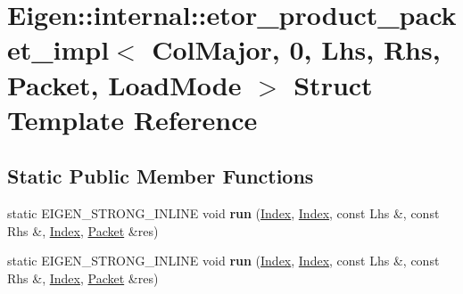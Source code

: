 \hypertarget{struct_eigen_1_1internal_1_1etor__product__packet__impl_3_01_col_major_00_010_00_01_lhs_00_01_rh608f8b3bd7848082420c49062c17a738}{}\section{Eigen\+:\+:internal\+:\+:etor\+\_\+product\+\_\+packet\+\_\+impl$<$ Col\+Major, 0, Lhs, Rhs, Packet, Load\+Mode $>$ Struct Template Reference}
\label{struct_eigen_1_1internal_1_1etor__product__packet__impl_3_01_col_major_00_010_00_01_lhs_00_01_rh608f8b3bd7848082420c49062c17a738}
\subsection*{Static Public Member Functions}
\begin{DoxyCompactItemize}
\item 
\mbox{\label{struct_eigen_1_1internal_1_1etor__product__packet__impl_3_01_col_major_00_010_00_01_lhs_00_01_rh608f8b3bd7848082420c49062c17a738_ab5bd5c2e1ef7f99f07d45f645fd88a00}} 
static E\+I\+G\+E\+N\+\_\+\+S\+T\+R\+O\+N\+G\+\_\+\+I\+N\+L\+I\+NE void {\bfseries run} (\hyperlink{namespace_eigen_a62e77e0933482dafde8fe197d9a2cfde}{Index}, \hyperlink{namespace_eigen_a62e77e0933482dafde8fe197d9a2cfde}{Index}, const Lhs \&, const Rhs \&, \hyperlink{namespace_eigen_a62e77e0933482dafde8fe197d9a2cfde}{Index}, \hyperlink{union_eigen_1_1internal_1_1_packet}{Packet} \&res)
\item 
\mbox{\label{struct_eigen_1_1internal_1_1etor__product__packet__impl_3_01_col_major_00_010_00_01_lhs_00_01_rh608f8b3bd7848082420c49062c17a738_ab5bd5c2e1ef7f99f07d45f645fd88a00}} 
static E\+I\+G\+E\+N\+\_\+\+S\+T\+R\+O\+N\+G\+\_\+\+I\+N\+L\+I\+NE void {\bfseries run} (\hyperlink{namespace_eigen_a62e77e0933482dafde8fe197d9a2cfde}{Index}, \hyperlink{namespace_eigen_a62e77e0933482dafde8fe197d9a2cfde}{Index}, const Lhs \&, const Rhs \&, \hyperlink{namespace_eigen_a62e77e0933482dafde8fe197d9a2cfde}{Index}, \hyperlink{union_eigen_1_1internal_1_1_packet}{Packet} \&res)
\end{DoxyCompactItemize}


